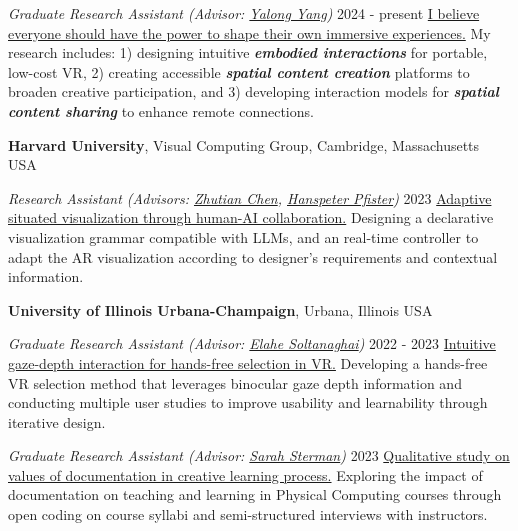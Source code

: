 \documentclass[margin,line]{res}
\newcommand{\link}[2]{\href{#2}{\textcolor{themecolor}{#1}}}
\newcommand{\institute}[3]{{\bf #1}, #2, #3}
\newcommand{\academicexperience}[3]{
  \vspace{-.2cm}
  {\em #1} \hfill #2 \newline
  #3
}
\begin{document}
\begin{resume}
\academicexperience
{Graduate Research Assistant (Advisor: \href{https://ivi.cc.gatech.edu/people.html}{Yalong Yang})}
{2024 - present}
{\link{I believe everyone should have the power to shape their own immersive experiences.}{https://www.chenyang.me/work/research-proposal-of-phd} 
My research includes: 1) designing intuitive \textbf{\textit{embodied interactions}} for portable, low-cost VR, 2) creating accessible \textbf{\textit{spatial content creation}} platforms to broaden creative participation, and 3) developing interaction models for \textbf{\textit{spatial content sharing}} to enhance remote connections.
}

\institute{Harvard University}{Visual Computing Group}{Cambridge, Massachusetts USA}
\vspace{-.1cm}

\academicexperience
{Research Assistant (Advisors: \href{https://chenzhutian.org/}{Zhutian Chen}, \href{https://vcg.seas.harvard.edu/people/hanspeter-pfister}{Hanspeter Pfister})}
{2023}
{\link{Adaptive situated visualization through human-AI collaboration.}{https://www.chenyang.me/work/adaptive-situated-visualization} 
Designing a declarative visualization grammar compatible with LLMs, and an real-time controller to adapt the AR visualization according to designer's requirements and contextual information.
}

\vspace{-.1cm}
\institute{University of Illinois Urbana-Champaign}{Urbana}{Illinois USA}
\vspace{-.1cm}

\academicexperience
{Graduate Research Assistant (Advisor: \href{https://elahe.web.illinois.edu/}{Elahe Soltanaghai})}
{2022 - 2023}
{\link{Intuitive gaze-depth interaction for hands-free selection in VR.}{https://www.chenyang.me/work/focusflow} 
Developing a hands-free VR selection method that leverages binocular gaze depth information and conducting multiple user studies to improve usability and learnability through iterative design.
}

\academicexperience
{Graduate Research Assistant (Advisor: \href{https://www.ssterman.web.illinois.edu/}{Sarah Sterman})}
{2023}
{\link{Qualitative study on values of documentation in creative learning process.}{https://www.chenyang.me/work/physcom-documentation} 
Exploring the impact of documentation on teaching and learning in Physical Computing courses through open coding on course syllabi and semi-structured interviews with instructors.
}


\end{resume}
\end{document}
